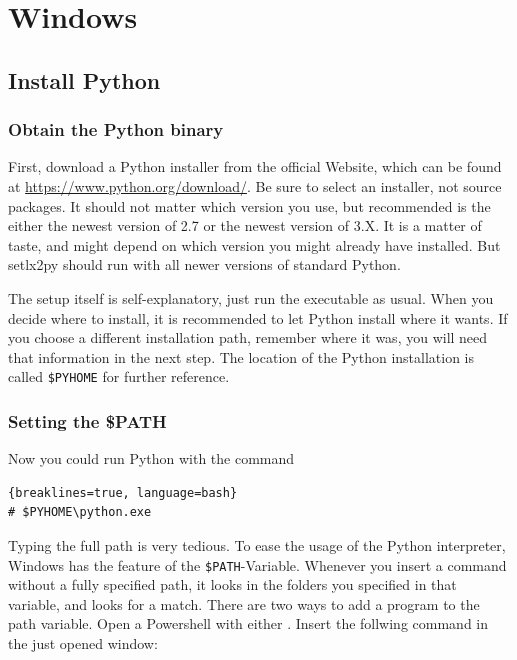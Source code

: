 \section{Windows}

\subsection{Install Python}

\subsubsection{Obtain the Python binary}

First, download a Python installer from the official Website, which can be found at \url{https://www.python.org/download/}. Be sure to select an installer, not source packages. It should not matter which version you use, but recommended is the either the newest version of 2.7 or the newest version of 3.X. It is a matter of taste, and might depend on which version you might already have installed. But setlx2py should run with all newer versions of standard Python.

The setup itself is self-explanatory, just run the executable as usual. When you decide where to install, it is recommended to let Python install where it wants. If you choose a different installation path, remember where it was, you will need that information in the next step. The location of the Python installation is called \texttt{\$PYHOME} for further reference.

\subsubsection{Setting the \$PATH}

Now you could run Python with the command

\begin{lstlisting}{breaklines=true, language=bash}
# $PYHOME\python.exe
\end{lstlisting}

Typing the full path is very tedious. To ease the usage of the Python interpreter, Windows has the feature of the \texttt{\$PATH}-Variable. Whenever you insert a command without a fully specified path, it looks in the folders you specified in that variable, and looks for a match. There are two ways to add a program to the path variable. Open a Powershell with either . Insert the follwing command in the just opened window: 

